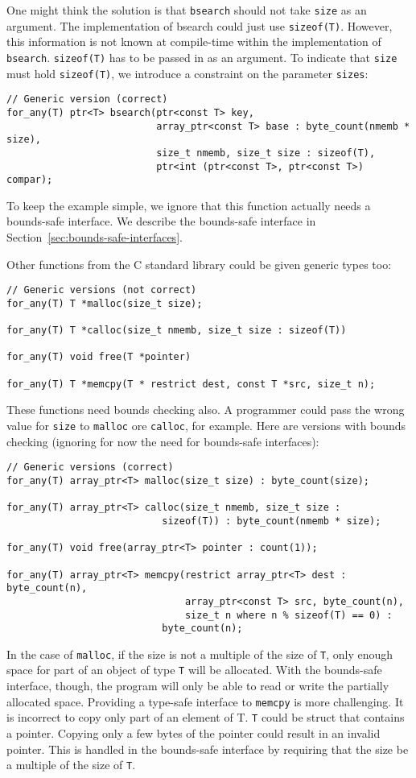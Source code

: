 One might think the solution is that \lstinline+bsearch+ should not take 
\lstinline+size+ as an argument.  The implementation of bsearch could just 
use \lstinline+sizeof(T)+. However, this information is not known at compile-time
within the implementation of \lstinline+bsearch+.   \lstinline+sizeof(T)+
has to be passed in as an argument.  To indicate that \lstinline+size+ must
hold \lstinline+sizeof(T)+, we introduce a constraint on the parameter \lstinline+sizes+:
\begin{lstlisting}
// Generic version (correct)
for_any(T) ptr<T> bsearch(ptr<const T> key,
                          array_ptr<const T> base : byte_count(nmemb * size),
                          size_t nmemb, size_t size : sizeof(T),
                          ptr<int (ptr<const T>, ptr<const T>) compar);
\end{lstlisting}
To keep the example simple, we ignore that this function actually needs a 
bounds-safe interface.  We describe the bounds-safe interface in 
Section~\ref{sec:bounds-safe-interfaces}.

Other functions from the C standard library could be given generic types too:
\begin{lstlisting}
// Generic versions (not correct)
for_any(T) T *malloc(size_t size);

for_any(T) T *calloc(size_t nmemb, size_t size : sizeof(T))

for_any(T) void free(T *pointer)

for_any(T) T *memcpy(T * restrict dest, const T *src, size_t n);
\end{lstlisting}
These functions need bounds checking also.  A programmer
could pass the wrong value for \lstinline+size+ to \lstinline+malloc+
ore \lstinline+calloc+, for example.  Here are
versions with bounds checking (ignoring for now the need for bounds-safe interfaces):
\begin{lstlisting}
// Generic versions (correct)
for_any(T) array_ptr<T> malloc(size_t size) : byte_count(size);

for_any(T) array_ptr<T> calloc(size_t nmemb, size_t size : 
                           sizeof(T)) : byte_count(nmemb * size);

for_any(T) void free(array_ptr<T> pointer : count(1));

for_any(T) array_ptr<T> memcpy(restrict array_ptr<T> dest : byte_count(n),
                               array_ptr<const T> src, byte_count(n),
                               size_t n where n % sizeof(T) == 0) :
                           byte_count(n);
\end{lstlisting}
In the case of \lstinline+malloc+, if the size is not a multiple of the size of \lstinline+T+,
only enough space for part of an object of type \lstinline+T+ will be allocated.  With the 
bounds-safe interface, though, the program will only be able to read or write the 
partially allocated space.   Providing a type-safe interface to \lstinline+memcpy+
is more challenging.   It is incorrect to copy only part of an element of T.
\lstinline+T+ could be struct that contains a pointer.  Copying only a few bytes
of the pointer could result in an invalid pointer.
This is handled in the bounds-safe interface by requiring that the
size be a multiple of the size of \lstinline+T+.


